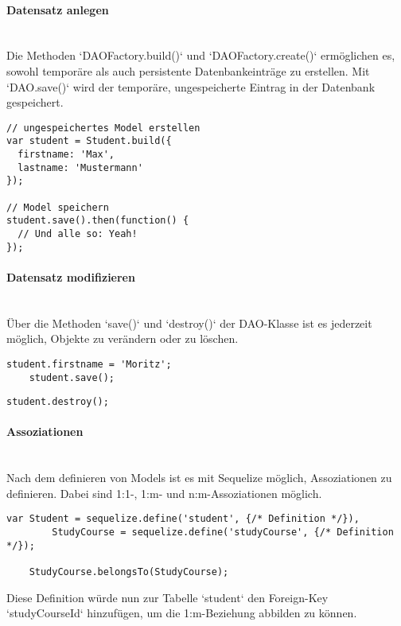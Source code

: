 \paragraph{Datensatz anlegen} \hspace{0pt} \\

Die Methoden `DAOFactory.build()` und `DAOFactory.create()` ermöglichen es, sowohl temporäre als auch persistente Datenbankeinträge zu erstellen. Mit `DAO.save()` wird der temporäre, ungespeicherte Eintrag in der Datenbank gespeichert.

\begin{lstlisting}[caption=Datensatz anlegen (Sequelize)]
// ungespeichertes Model erstellen
var student = Student.build({
  firstname: 'Max',
  lastname: 'Mustermann'
});

// Model speichern
student.save().then(function() {
  // Und alle so: Yeah!
});	
\end{lstlisting}


\paragraph{Datensatz modifizieren} \hspace{0pt} \\

Über die Methoden `save()` und `destroy()` der DAO-Klasse ist es jederzeit möglich, Objekte zu verändern oder zu löschen.

\begin{lstlisting}[caption=Datensatz ändern (Sequelize)]
	student.firstname = 'Moritz';
	student.save();
\end{lstlisting}

\begin{lstlisting}[caption=Datensatz löschen (Sequelize)]
	student.destroy();
\end{lstlisting}



\paragraph{Assoziationen} \hspace{0pt} \\

Nach dem definieren von Models ist es mit Sequelize möglich, Assoziationen zu definieren. Dabei sind 1:1-, 1:m- und n:m-Assoziationen möglich.

\begin{lstlisting}[caption=Datensatz anlegen (Sequelize)]
	var Student = sequelize.define('student', {/* Definition */}),
    	StudyCourse = sequelize.define('studyCourse', {/* Definition */});
	
	StudyCourse.belongsTo(StudyCourse);
\end{lstlisting}

Diese Definition würde nun zur Tabelle `student` den Foreign-Key `studyCourseId` hinzufügen, um die 1:m-Beziehung abbilden zu können.




